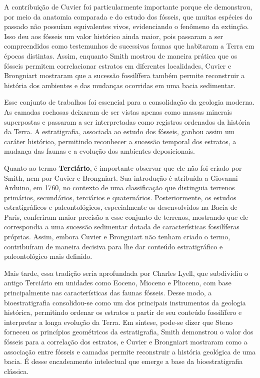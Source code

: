 A contribuição de Cuvier foi particularmente importante porque ele demonstrou, por meio da anatomia comparada e do estudo dos fósseis, que muitas espécies do passado não possuíam equivalentes vivos, evidenciando o fenômeno da extinção. Isso deu aos fósseis um valor histórico ainda maior, pois passaram a ser compreendidos como testemunhos de sucessivas faunas que habitaram a Terra em épocas distintas. Assim, enquanto Smith mostrou de maneira prática que os fósseis permitem correlacionar estratos em diferentes localidades, Cuvier e Brongniart mostraram que a sucessão fossilífera também permite reconstruir a história dos ambientes e das mudanças ocorridas em uma bacia sedimentar.

Esse conjunto de trabalhos foi essencial para a consolidação da geologia moderna. As camadas rochosas deixaram de ser vistas apenas como massas minerais superpostas e passaram a ser interpretadas como registros ordenados da história da Terra. A estratigrafia, associada ao estudo dos fósseis, ganhou assim um caráter histórico, permitindo reconhecer a sucessão temporal dos estratos, a mudança das faunas e a evolução dos ambientes deposicionais.

Quanto ao termo \textbf{Terciário}, é importante observar que ele não foi criado por Smith, nem por Cuvier e Brongniart. Sua introdução é atribuída a Giovanni Arduino, em 1760, no contexto de uma classificação que distinguia terrenos primários, secundários, terciários e quaternários. Posteriormente, os estudos estratigráficos e paleontológicos, especialmente os desenvolvidos na Bacia de Paris, conferiram maior precisão a esse conjunto de terrenos, mostrando que ele correspondia a uma sucessão sedimentar dotada de características fossilíferas próprias. Assim, embora Cuvier e Brongniart não tenham criado o termo, contribuíram de maneira decisiva para lhe dar conteúdo estratigráfico e paleontológico mais definido.

Mais tarde, essa tradição seria aprofundada por Charles Lyell, que subdividiu o antigo Terciário em unidades como Eoceno, Mioceno e Plioceno, com base principalmente nas características das faunas fósseis. Desse modo, a bioestratigrafia consolidou-se como um dos principais instrumentos da geologia histórica, permitindo ordenar os estratos a partir de seu conteúdo fossilífero e interpretar a longa evolução da Terra. Em síntese, pode-se dizer que Steno forneceu os princípios geométricos da estratigrafia, Smith demonstrou o valor dos fósseis para a correlação dos estratos, e Cuvier e Brongniart mostraram como a associação entre fósseis e camadas permite reconstruir a história geológica de uma bacia. É desse encadeamento intelectual que emerge a base da bioestratigrafia clássica.

